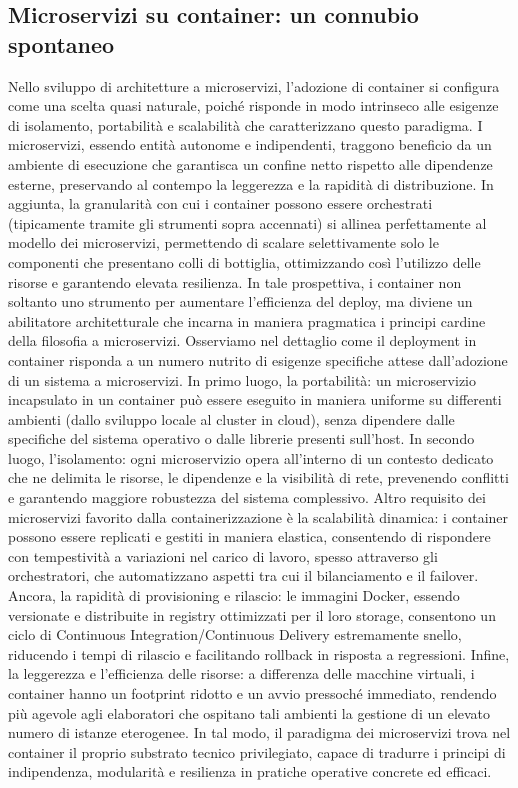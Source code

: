 \subsection{Microservizi su container: un connubio spontaneo}
Nello sviluppo di architetture a microservizi, l’adozione di container si configura come una scelta quasi naturale, poiché risponde in modo intrinseco alle esigenze di isolamento, portabilità e scalabilità che caratterizzano questo paradigma. I microservizi, essendo entità autonome e indipendenti, traggono beneficio da un ambiente di esecuzione che garantisca un confine netto rispetto alle dipendenze esterne, preservando al contempo la leggerezza e la rapidità di distribuzione. In aggiunta, la granularità con cui i container possono essere orchestrati (tipicamente tramite gli strumenti sopra accennati) si allinea perfettamente al modello dei microservizi, permettendo di scalare selettivamente solo le componenti che presentano colli di bottiglia, ottimizzando così l’utilizzo delle risorse e garantendo elevata resilienza. In tale prospettiva, i container non soltanto uno strumento per aumentare l'efficienza del deploy, ma diviene un abilitatore architetturale che incarna in maniera pragmatica i principi cardine della filosofia a microservizi.
Osserviamo nel dettaglio come il deployment in container risponda a un numero nutrito di esigenze specifiche attese dall'adozione di un sistema a microservizi.
In primo luogo, la portabilità: un microservizio incapsulato in un container può essere eseguito in maniera uniforme su differenti ambienti (dallo sviluppo locale al cluster in cloud), senza dipendere dalle specifiche del sistema operativo o dalle librerie presenti sull’host. In secondo luogo, l’isolamento: ogni microservizio opera all’interno di un contesto dedicato che ne delimita le risorse, le dipendenze e la visibilità di rete, prevenendo conflitti e garantendo maggiore robustezza del sistema complessivo. Altro requisito dei microservizi favorito dalla containerizzazione è la scalabilità dinamica: i container possono essere replicati e gestiti in maniera elastica, consentendo di rispondere con tempestività a variazioni nel carico di lavoro, spesso attraverso gli orchestratori, che automatizzano aspetti tra cui il bilanciamento e il failover. Ancora, la rapidità di provisioning e rilascio: le immagini Docker, essendo versionate e distribuite in registry ottimizzati per il loro storage, consentono un ciclo di Continuous Integration/Continuous Delivery estremamente snello, riducendo i tempi di rilascio e facilitando rollback in risposta a regressioni. Infine, la leggerezza e l’efficienza delle risorse: a differenza delle macchine virtuali, i container hanno un footprint ridotto e un avvio pressoché immediato, rendendo più agevole agli elaboratori che ospitano tali ambienti la gestione di un elevato numero di istanze eterogenee. In tal modo, il paradigma dei microservizi trova nel container il proprio substrato tecnico privilegiato, capace di tradurre i principi di indipendenza, modularità e resilienza in pratiche operative concrete ed efficaci.



